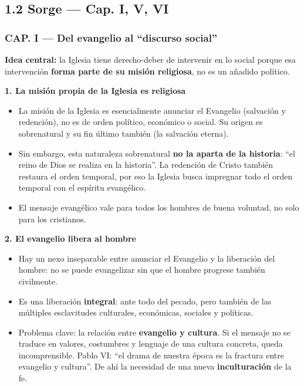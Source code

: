 \documentclass[10pt,a4paper]{article}
\begin{document}
\subsection{1.2 Sorge --- Cap. I, V, VI}

\subsubsection{CAP. I --- Del evangelio al ``discurso social''}

\noindent \textbf{Idea central:} la Iglesia tiene derecho-deber de intervenir en lo social porque esa intervención \textbf{forma parte de su misión religiosa}, no es un añadido político.\par\smallskip

\medskip\noindent \textbf{1. La misión propia de la Iglesia es religiosa}\par\nopagebreak
\begin{itemize}
\item La misión de la Iglesia es esencialmente anunciar el Evangelio (salvación y redención), no es de orden político, económico o social. Su origen es sobrenatural y su fin último también (la salvación eterna).
\item Sin embargo, esta naturaleza sobrenatural \textbf{no la aparta de la historia}: ``el reino de Dios se realiza en la historia''. La redención de Cristo también restaura el orden temporal, por eso la Iglesia busca impregnar todo el orden temporal con el espíritu evangélico.
\item El mensaje evangélico vale para todos los hombres de buena voluntad, no solo para los cristianos.
\end{itemize}

\medskip\noindent \textbf{2. El evangelio libera al hombre}\par\nopagebreak
\begin{itemize}
\item Hay un nexo inseparable entre anunciar el Evangelio y la liberación del hombre: no se puede evangelizar sin que el hombre progrese también civilmente.
\item Es una liberación \textbf{integral}: ante todo del pecado, pero también de las múltiples esclavitudes culturales, económicas, sociales y políticas.
\item Problema clave: la relación entre \textbf{evangelio y cultura}. Si el mensaje no se traduce en valores, costumbres y lenguaje de una cultura concreta, queda incomprensible. Pablo VI: ``el drama de nuestra época es la fractura entre evangelio y cultura''. De ahí la necesidad de una nueva \textbf{inculturación} de la fe.
\end{itemize}
\end{document}
